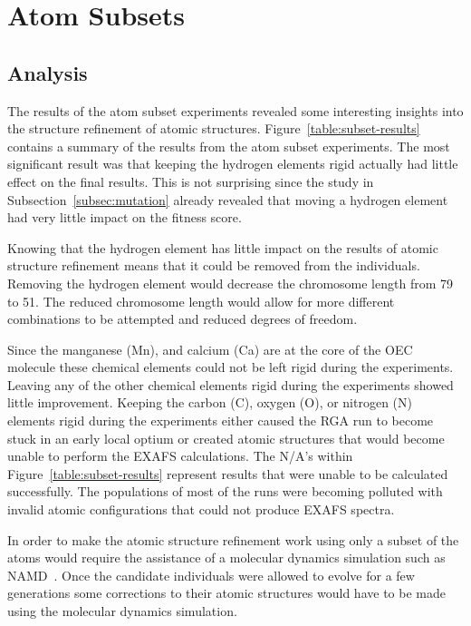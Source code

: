 \section{Atom Subsets}

\subsection{Analysis}

The results of the atom subset experiments revealed some interesting insights into the structure refinement of atomic structures. Figure~\ref{table:subset-results} contains a summary of the results from the atom subset experiments. The most significant result was that keeping the hydrogen elements rigid actually had little effect on the final results. This is not surprising since the study in Subsection~\ref{subsec:mutation} already revealed that moving a hydrogen element had very little impact on the fitness score.

Knowing that the hydrogen element has little impact on the results of atomic structure refinement means that it could be removed from the individuals. Removing the hydrogen element would decrease the chromosome length from 79 to 51. The reduced chromosome length would allow for more different combinations to be attempted and reduced degrees of freedom.

Since the manganese (Mn), and calcium (Ca) are at the core of the OEC molecule these chemical elements could not be left rigid during the experiments. Leaving any of the other chemical elements rigid during the experiments showed little improvement. Keeping the carbon (C), oxygen (O), or nitrogen (N) elements rigid during the experiments either caused the RGA run to become stuck in an early local optium or created atomic structures that would become unable to perform the EXAFS calculations. The N/A's within Figure~\ref{table:subset-results} represent results that were unable to be calculated successfully. The populations of most of the runs were becoming polluted with invalid atomic configurations that could not produce EXAFS spectra.

In order to make the atomic structure refinement work using only a subset of the atoms would require the assistance of a molecular dynamics simulation such as NAMD~\cite{namd}. Once the candidate individuals were allowed to evolve for a few generations some corrections to their atomic structures would have to be made using the molecular dynamics simulation.

